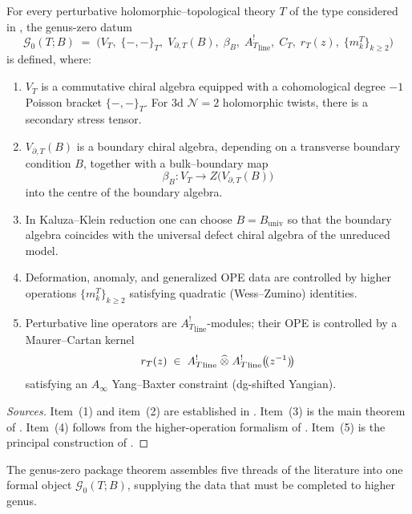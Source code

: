 \begin{theorem}
\label{thm:genus-zero-holographic-package}
For every perturbative holomorphic--topological theory $T$ of the type considered in
\cite{CDG20, Zeng23, GKW25, KZ25, DNP25}, the genus-zero datum
\[
\mathcal G_0(T;B)
\;=\;
\bigl(V_T,\;\{-,-\}_T,\;V_{\partial,T}(B),\;\beta_B,\;{A_T^!}_{\mathrm{line}},\;C_T,\;r_T(z),\;\{m_k^T\}_{k\ge 2}\bigr)
\]
is defined, where:
\begin{enumerate}[label=\textup{(\arabic*)}]
\item $V_T$ is a commutative chiral algebra equipped with a cohomological degree $-1$ Poisson
bracket $\{-,-\}_T$. For $3$d $\mathcal N=2$ holomorphic twists, there is a secondary stress
tensor.

\item $V_{\partial,T}(B)$ is a boundary chiral algebra, depending on a transverse boundary
condition $B$, together with a bulk--boundary map
\[
\beta_B:V_T\longrightarrow Z\bigl(V_{\partial,T}(B)\bigr)
\]
into the centre of the boundary algebra.

\item In Kaluza--Klein reduction one can choose $B=B_{\mathrm{univ}}$ so that the boundary algebra
coincides with the universal defect chiral algebra of the unreduced model.

\item Deformation, anomaly, and generalized OPE data are controlled by higher operations
$\{m_k^T\}_{k\ge 2}$ satisfying quadratic (Wess--Zumino) identities.

\item Perturbative line operators are ${A_T^!}_{\mathrm{line}}$-modules; their OPE is controlled by a
Maurer--Cartan kernel
\[
r_T(z)\;\in\;{A_T^!}_{\mathrm{line}}\;\widehat\otimes\;{A_T^!}_{\mathrm{line}}\bigl(\!(z^{-1})\!\bigr)
\]
satisfying an $A_\infty$ Yang--Baxter constraint (dg-shifted Yangian).
\end{enumerate}
\end{theorem}

\begin{proof}[Sources]
Item~\textup{(1)} and item~\textup{(2)} are established in
\cite{CDG20}. Item~\textup{(3)} is the main theorem of \cite{Zeng23}. Item~\textup{(4)}
follows from the higher-operation formalism of \cite{GKW25}. Item~\textup{(5)} is the
principal construction of \cite{DNP25}.
\end{proof}

\begin{remark}
\label{rem:genus-zero-package-modular-context}
The genus-zero package theorem assembles five threads of the
literature into one formal object $\mathcal G_0(T;B)$, supplying the
data that must be completed to higher genus.
\end{remark}

